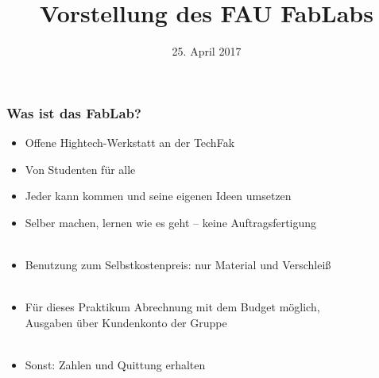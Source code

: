 \documentclass[t]{beamer}
\begin{document}


\date{25. April 2017}
\title[Vorstellung]{Vorstellung des FAU FabLabs}
\author{} %
\frame[plain,c]{\titlepage} %




\begin{frame}
    \frametitle{Was ist das FabLab?}
    \begin{itemize}
        \item Offene Hightech-Werkstatt an der TechFak
        \item Von Studenten für alle
        \item Jeder kann kommen und seine eigenen Ideen umsetzen
        \item Selber machen, lernen wie es geht -- keine Auftragsfertigung\\~
        \item Benutzung zum Selbstkostenpreis: nur Material und Verschleiß\\~
        \item Für dieses Praktikum Abrechnung mit dem Budget möglich,\\
        Ausgaben über Kundenkonto der Gruppe\\~
        \item Sonst: Zahlen und Quittung erhalten
    \end{itemize}

\end{frame}
\end{document}
